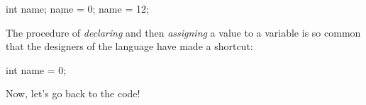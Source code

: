 \documentclass[]{book}
\newenvironment{Shaded}{}{}
\newcommand{\DataTypeTok}[1]{\textcolor[rgb]{0.56,0.13,0.00}{#1}}
\newcommand{\DecValTok}[1]{\textcolor[rgb]{0.25,0.63,0.44}{#1}}
\newcommand{\NormalTok}[1]{#1}
\begin{document}
\begin{framed}

\begin{Shaded}
\begin{Highlighting}[]
\DataTypeTok{int}\NormalTok{ name;}
\NormalTok{name = }\DecValTok{0}\NormalTok{;}
\NormalTok{name = }\DecValTok{12}\NormalTok{;}
\end{Highlighting}
\end{Shaded}

\end{framed}

The procedure of \emph{declaring} and then \emph{assigning} a value to a
variable is so common that the designers of the language have made a
shortcut:

\begin{framed}

\begin{Shaded}
\begin{Highlighting}[]
\DataTypeTok{int}\NormalTok{ name = }\DecValTok{0}\NormalTok{;}
\end{Highlighting}
\end{Shaded}

\end{framed}

Now, let's go back to the code!

\newpage

\vspace{2mm}\noindent\hrulefill{}
\end{document}
